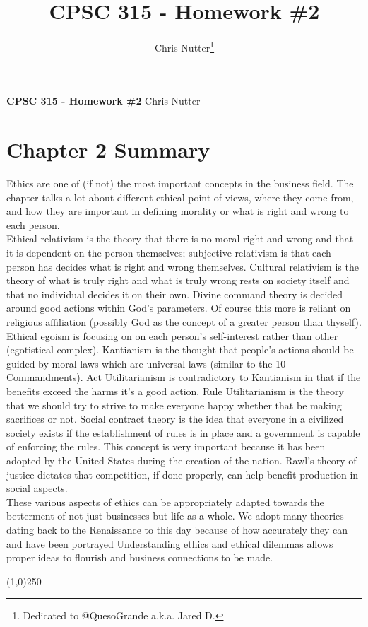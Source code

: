 \documentclass[12pt,a4paper]{article}
\title{CPSC 315 - Homework \#2}
\author{Chris Nutter\thanks{Dedicated to @QuesoGrande a.k.a. Jared D.}}
\begin{document}
\begin{center}
    {\textbf{\LARGE CPSC 315 - Homework \#2}
        \vskip 6pt
     \large Chris Nutter}
\end{center}

\section{Chapter 2 Summary}
\indent Ethics are one of (if not) the most important concepts in the business field. The chapter talks a lot about different ethical point of views, where they come from, and how they are important in defining morality or what is right and wrong to each person.\\
\indent Ethical relativism is the theory that there is no moral right and wrong and that it is dependent on the person themselves; subjective relativism is that each person has decides what is right and wrong themselves. Cultural relativism is the theory of what is truly right and what is truly wrong rests on society itself and that no individual decides it on their own. Divine command theory is decided around good actions within God's parameters. Of course this more is reliant on religious affiliation (possibly God as the concept of a greater person than thyself). Ethical egoism is focusing on on each person's self-interest rather than other (egotistical complex). Kantianism is the thought that people's actions should be guided by moral laws which are universal laws (similar to the 10 Commandments). Act Utilitarianism is contradictory to Kantianism in that if the benefits exceed the harms it's a good action. Rule Utilitarianism is the theory that we should try to strive to make everyone happy whether that be making sacrifices or not. Social contract theory is the idea that everyone in a civilized society exists if the establishment of rules is in place and a government is capable of enforcing the rules. This concept is very important because it has been adopted by the United States during the creation of the nation. Rawl's theory of justice dictates that competition, if done properly, can help benefit production in social aspects.\\
\indent These various aspects of ethics can be appropriately adapted towards the betterment of not just businesses but life as a whole. We adopt many theories dating back to the Renaissance to this day because of how accurately they can and have been portrayed Understanding ethics and ethical dilemmas allows proper ideas to flourish and business connections to be made.
    \begin{center}\line(1,0){250}\end{center}
\end{document}

